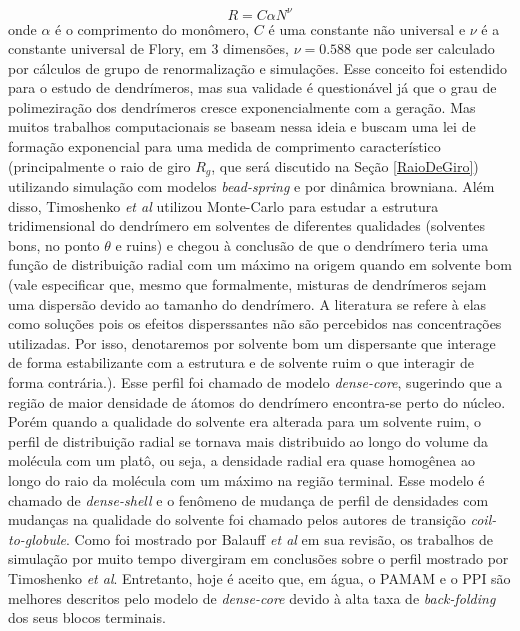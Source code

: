 \begin{equation}
R=C\alpha N^\nu
\end{equation}
onde $\alpha$ é o comprimento do monômero, $C$ é uma constante não universal e $\nu$ é a constante universal de Flory, em 3 dimensões, $\nu=0.588$ que pode ser calculado por cálculos de grupo de renormalização e simulações.
Esse conceito foi estendido para o estudo de dendrímeros, mas sua validade é questionável já que o grau de polimeziração dos dendrímeros cresce exponencialmente com a geração.
Mas muitos trabalhos computacionais se baseam nessa ideia e buscam uma lei de formação exponencial para uma medida de comprimento característico (principalmente o raio de giro $R_g$, que será discutido na Seção \ref{RaioDeGiro}) utilizando simulação com modelos \textit{bead-spring}\cite{Zhou2006} e por dinâmica browniana\cite{Bosko2011}.
Além disso, Timoshenko \textit{et al}\cite{Timoshenko2002} utilizou Monte-Carlo para estudar a estrutura tridimensional do dendrímero em solventes de diferentes qualidades (solventes bons, no ponto $\theta$ e ruins\cite{Bosko2011}) e chegou à conclusão de que o dendrímero teria uma função de distribuição radial com um máximo na origem quando em solvente bom (vale especificar que, mesmo que formalmente, misturas de dendrímeros sejam uma dispersão devido ao tamanho do dendrímero. A literatura se refere à elas como soluções pois os efeitos disperssantes não são percebidos nas concentrações utilizadas. Por isso, denotaremos por solvente bom um dispersante que interage de forma estabilizante com a estrutura e de solvente ruim o que interagir de forma contrária.).
Esse perfil foi chamado de modelo \textit{dense-core}, sugerindo que a região de maior densidade de átomos do dendrímero encontra-se perto do núcleo.
Porém quando a qualidade do solvente era alterada para um solvente ruim, o perfil de distribuição radial se tornava mais distribuido ao longo do volume da molécula com um platô, ou seja, a densidade radial era quase homogênea ao longo do raio da molécula com um máximo na região terminal.
Esse modelo é chamado de \textit{dense-shell} e o fenômeno de mudança de perfil de densidades com mudanças na qualidade do solvente foi chamado pelos autores de transição \textit{coil-to-globule}.
Como foi mostrado por Balauff \textit{et al}\cite{Ballauff2004} em sua revisão, os trabalhos de simulação por muito tempo divergiram em conclusões sobre o perfil mostrado por Timoshenko \textit{et al}\cite{Timoshenko2002}.
Entretanto, hoje é aceito que, em água, o PAMAM e o PPI são melhores descritos pelo modelo de \textit{dense-core} devido à alta taxa de \textit{back-folding} dos seus blocos terminais.
